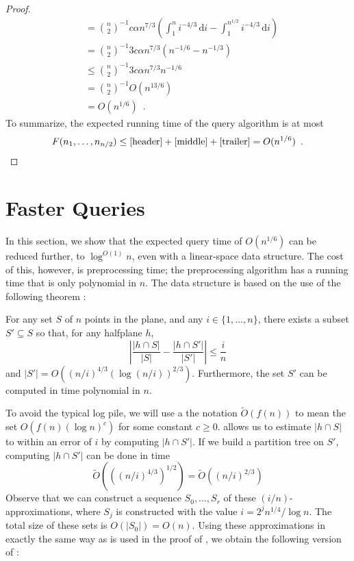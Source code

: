 \documentclass{patmorin}
\begin{document}
\begin{proof}
\begin{align*}
      & = \binom{n}{2}^{-1} 
       c\alpha n^{7/3}\left(\int_{1}^{n} i^{-4/3}\,\mathrm{d}i
         - \int_{1}^{n^{1/2}} i^{-4/3}\,\mathrm{d}i  \right) \\
      & = \binom{n}{2}^{-1} 
       3c\alpha n^{7/3}\left(n^{-1/6} - n^{-1/3}\right) \\
      & \le \binom{n}{2}^{-1} 
       3c\alpha n^{7/3}n^{-1/6} \\
      & = \binom{n}{2}^{-1} O(n^{13/6}) \\
      & = O(n^{1/6}) \enspace .
  \end{align*}
  To summarize, the expected running time of the query algorithm is at most
  \[ 
     F(n_1,\ldots,n_{n/2}) \le \eqref{header} + \eqref{middle} + \eqref{trailer}
     = O(n^{1/6}) \enspace . \qedhere
  \]
\end{proof}


\section{Faster Queries}

In this section, we show that the expected query time of $O(n^{1/6})$
can be reduced further, to $\log^{O(1)} n$, even with a linear-space
data structure.  The cost of this, however, is preprocessing time;
the preprocessing algorithm has a running time that is only polynomial
in $n$.  The data structure is based on the use of the following theorem
\cite{c04,mww93}:

\begin{thm}
  For any set $S$ of $n$ points in the plane, and any $i\in\{1,\ldots,n\}$,
  there exists a subset $S'\subseteq S$ so that, for any halfplane $h$,
  \[  \left|\frac{|h\cap S|}{|S|} - \frac{|h\cap S'|}{|S'|}\right| \le \frac{i}{n} \] 
  and $|S'| = O((n/i)^{4/3}(\log (n/i))^{2/3})$.  Furthermore, the set $S'$
  can be computed in time polynomial in $n$.
\end{thm}

\newcommand{\Oh}{\tilde{O}}

To avoid the typical log pile, we will use a the notation $\Oh(f(n))$
to mean the set $O(f(n)(\log n)^c)$ for some constant $c \ge 0$.
 allows us to estimate $|h\cap S|$ to within an error of
$i$ by computing $|h\cap S'|$.  If we build a partition tree on $S'$,
computing $|h\cap S'|$ can be done in time
\[
 \Oh(((n/i)^{4/3})^{1/2}) 
    = \Oh((n/i)^{2/3})
\]
Observe that we can construct a sequence $S_0,\ldots,S_r$ of these
$(i/n)$-approximations, where $S_j$ is constructed with the
value $i=2^jn^{1/4}/\log n$.  The total size of these sets is
$O(|S_0|)=O(n)$.  Using these approximations in exactly the same way
as  is used in the proof of ,
we obtain the following version of :
\end{document}
